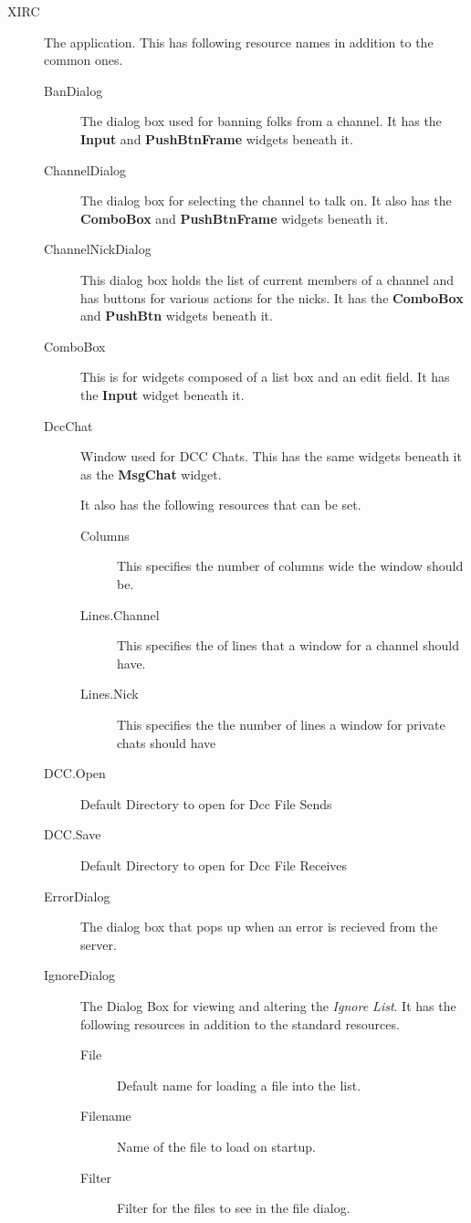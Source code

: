 \documentclass[titlepage]{article}
\begin{document}
\begin{description}

\item[XIRC] The application. This has following resource names
in addition to the common ones.

\begin{description}
\item[BanDialog] The dialog box used for banning folks from a channel.
It has the \textbf{Input} and \textbf{PushBtnFrame} widgets beneath
it.

\item[ChannelDialog] The dialog box for selecting the channel to talk
on. It also has the \textbf{ComboBox} and \textbf{PushBtnFrame}
widgets beneath it.

\item[ChannelNickDialog] This dialog box holds the list of current
members of a channel and has buttons for various actions for the
nicks. It has the \textbf{ComboBox} and \textbf{PushBtn} widgets
beneath it.

\item[ComboBox] This is for widgets composed of a list box and an
edit field. It has the \textbf{Input} widget beneath it.

\item[DccChat] Window used for DCC Chats. This has the same
widgets beneath it as the \textbf{MsgChat} widget.

It also has the following resources that can be set.

\begin{description}
\item[Columns] This specifies the number of columns wide the window should be.
\item[Lines.Channel] This specifies the of lines that a window for a channel
should have.
\item[Lines.Nick] This specifies the the number of lines a window for private
chats should have
\end{description}


\item[DCC.Open] Default Directory to open for Dcc File Sends

\item[DCC.Save] Default Directory to open for Dcc File Receives

\item[ErrorDialog] The dialog box that pops up when an error is
recieved from the server.

\item[IgnoreDialog] The Dialog Box for viewing and altering the \emph{Ignore
List}. It has the following resources in addition to the standard
resources.
\begin{description}
\item[File] Default name for loading a file into the list.
\item[Filename] Name of the file to load on startup.
\item[Filter] Filter for the files to see in the file dialog.
\end{description}


\end{description}
\end{description}
\end{document}
